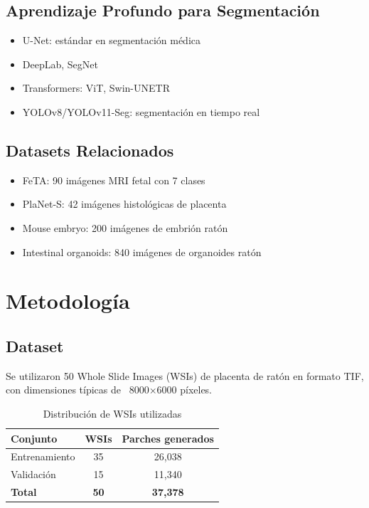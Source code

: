 \documentclass[12pt,a4paper]{article}
\begin{document}
\subsection{Aprendizaje Profundo para Segmentación}
\begin{itemize}
    \item U-Net: estándar en segmentación médica
    \item DeepLab, SegNet
    \item Transformers: ViT, Swin-UNETR
    \item YOLOv8/YOLOv11-Seg: segmentación en tiempo real
\end{itemize}

\subsection{Datasets Relacionados}
\begin{itemize}
    \item FeTA: 90 imágenes MRI fetal con 7 clases
    \item PlaNet-S: 42 imágenes histológicas de placenta
    \item Mouse embryo: 200 imágenes de embrión ratón
    \item Intestinal organoids: 840 imágenes de organoides ratón
\end{itemize}

\section{Metodología}

\subsection{Dataset}

Se utilizaron 50 Whole Slide Images (WSIs) de placenta de ratón en formato TIF, con dimensiones típicas de ~8000×6000 píxeles.

\begin{table}[ht]
\centering
\caption{Distribución de WSIs utilizadas}
\label{tab:wsi-dist}
\begin{tabular}{@{}lcc@{}}
\toprule
Conjunto & WSIs & Parches generados \\ \midrule
Entrenamiento & 35 & 26,038 \\
Validación & 15 & 11,340 \\ \midrule
\textbf{Total} & \textbf{50} & \textbf{37,378} \\ \bottomrule
\end{tabular}
\end{table}
\end{document}

